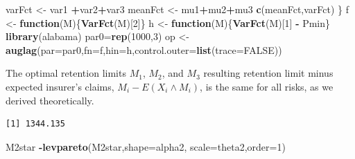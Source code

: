 \documentclass[]{book}
\newenvironment{Shaded}{\begin{snugshade}}{\end{snugshade}}
\newcommand{\KeywordTok}[1]{\textcolor[rgb]{0.13,0.29,0.53}{\textbf{#1}}}
\newcommand{\DataTypeTok}[1]{\textcolor[rgb]{0.13,0.29,0.53}{#1}}
\newcommand{\DecValTok}[1]{\textcolor[rgb]{0.00,0.00,0.81}{#1}}
\newcommand{\StringTok}[1]{\textcolor[rgb]{0.31,0.60,0.02}{#1}}
\newcommand{\OtherTok}[1]{\textcolor[rgb]{0.56,0.35,0.01}{#1}}
\newcommand{\ControlFlowTok}[1]{\textcolor[rgb]{0.13,0.29,0.53}{\textbf{#1}}}
\newcommand{\OperatorTok}[1]{\textcolor[rgb]{0.81,0.36,0.00}{\textbf{#1}}}
\newcommand{\NormalTok}[1]{#1}
\theoremstyle{definition}
\theoremstyle{definition}
\theoremstyle{definition}
\theoremstyle{remark}
\begin{document}
\begin{Shaded}
\begin{Highlighting}[]
\NormalTok{  varFct <-}\StringTok{ }\NormalTok{var1 }\OperatorTok{+}\NormalTok{var2}\OperatorTok{+}\NormalTok{var3}
\NormalTok{  meanFct <-}\StringTok{ }\NormalTok{mu1}\OperatorTok{+}\NormalTok{mu2}\OperatorTok{+}\NormalTok{mu3}
  \KeywordTok{c}\NormalTok{(meanFct,varFct)}
\NormalTok{  \}}
\NormalTok{f <-}\StringTok{ }\ControlFlowTok{function}\NormalTok{(M)\{}\KeywordTok{VarFct}\NormalTok{(M)[}\DecValTok{2}\NormalTok{]\}}
\NormalTok{h <-}\StringTok{ }\ControlFlowTok{function}\NormalTok{(M)\{}\KeywordTok{VarFct}\NormalTok{(M)[}\DecValTok{1}\NormalTok{] }\OperatorTok{-}\StringTok{ }\NormalTok{Pmin\}}
\KeywordTok{library}\NormalTok{(alabama)}
\NormalTok{par0=}\KeywordTok{rep}\NormalTok{(}\DecValTok{1000}\NormalTok{,}\DecValTok{3}\NormalTok{)}
\NormalTok{op <-}\StringTok{ }\KeywordTok{auglag}\NormalTok{(}\DataTypeTok{par=}\NormalTok{par0,}\DataTypeTok{fn=}\NormalTok{f,}\DataTypeTok{hin=}\NormalTok{h,}\DataTypeTok{control.outer=}\KeywordTok{list}\NormalTok{(}\DataTypeTok{trace=}\OtherTok{FALSE}\NormalTok{))}
\end{Highlighting}
\end{Shaded}

The optimal retention limits \(M_1\), \(M_2\), and \(M_3\) resulting
retention limit minus expected insurer's claims,
\(M_i - E(X_i \wedge M_i)\), is the same for all risks, as we derived
theoretically.

\begin{Shaded}
\end{Shaded}

\begin{verbatim}
[1] 1344.135
\end{verbatim}

\begin{Shaded}
\begin{Highlighting}[]
\NormalTok{M2star }\OperatorTok{-}\KeywordTok{levpareto}\NormalTok{(M2star,}\DataTypeTok{shape=}\NormalTok{alpha2, }\DataTypeTok{scale=}\NormalTok{theta2,}\DataTypeTok{order=}\DecValTok{1}\NormalTok{)}
\end{Highlighting}
\end{Shaded}
\end{document}
